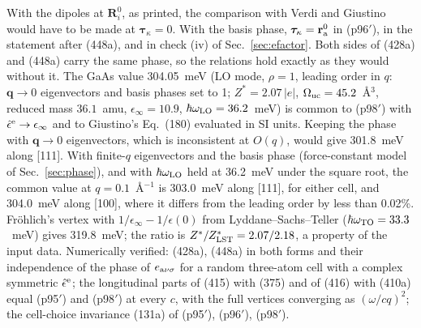\documentclass[11pt]{article}
\begin{document}
With the dipoles at $\mathbf R^0_i$, as printed, the comparison with Verdi and Giustino would have to be
made at $\bm{\tau}_\kappa=0$. With the basis phase, $\bm{\tau}_\kappa=\mathbf r^0_{\rm a}$ in (p96$'$), in the
statement after (448a), and in check (iv) of Sec.~\ref{sec:efactor}. Both sides of (428a) and (448a) carry
the same phase, so the relations hold exactly as they would without it. The GaAs value 304.05~meV
(LO mode, $\rho=1$, leading order in $q$: $\mathbf q\to0$ eigenvectors and basis phases set to 1;
$Z^*=2.07\,|e|$, $\Omega_{\rm uc}=45.2$~\AA$^3$, reduced mass $36.1$~amu, $\epsilon_\infty=10.9$,
$\hbar\omega_{\rm LO}=36.2$~meV) is common to (p98$'$) with $\hat\epsilon^{\rm e}\to\epsilon_\infty$ and to
Giustino's Eq.~(180) evaluated in SI units. Keeping the phase with $\mathbf q\to0$ eigenvectors, which is
inconsistent at $O(q)$, would give 301.8~meV along [111]. With finite-$q$ eigenvectors and the basis
phase (force-constant model of Sec.~\ref{sec:phase}), and with $\hbar\omega_{\rm LO}$ held at 36.2~meV
under the square root, the common value at $q=0.1$~\AA$^{-1}$ is 303.0~meV along [111], for either cell,
and 304.0~meV along [100], where it differs from the leading order by less than 0.02\%. Fr\"ohlich's vertex with
$1/\epsilon_\infty-1/\epsilon(0)$ from Lyddane--Sachs--Teller ($\hbar\omega_{\rm TO}=33.3$~meV) gives
319.8~meV; the ratio is $Z^*/Z^*_{\rm LST}=2.07/2.18$, a property of the input data. Numerically
verified: (428a), (448a) in both forms and their independence of the phase of $e_{{\rm a}\nu\sigma}$ for a
random three-atom cell with a complex symmetric $\hat\epsilon^{\rm e}$; the longitudinal parts of (415) with
(375) and of (416) with (410a) equal (p95$'$) and (p98$'$) at every $c$, with the full vertices converging
as $(\omega/cq)^2$; the cell-choice invariance (131a) of (p95$'$), (p96$'$), (p98$'$).
\end{document}
